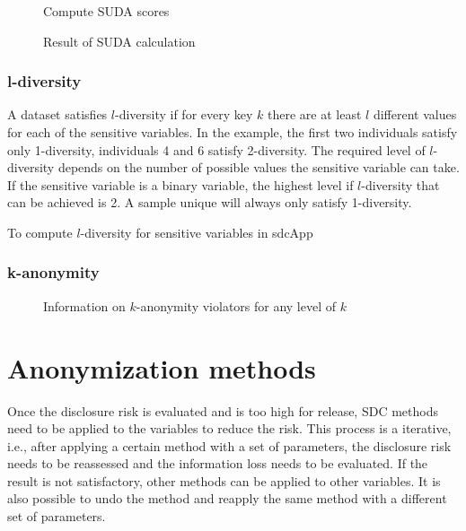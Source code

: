 \documentclass[letterpaper,10pt,english]{sphinxmanual}
\begin{document}
\begin{figure}[htbp]
\centering
\capstart

\noindent{}
\caption{Compute SUDA scores}\label{\detokenize{risk:id1}}\label{\detokenize{risk:id3}}\end{figure}

\begin{figure}[htbp]
\centering
\capstart

\noindent{}
\caption{Result of SUDA calculation}\label{\detokenize{risk:fig72}}\label{\detokenize{risk:id4}}\end{figure}


\subsection{l-diversity}
\label{\detokenize{risk:l-diversity}}
A dataset
satisfies \(l\)-diversity if for every key \(k\) there are at least
\(l\) different values for each of the sensitive variables. In the
example, the first two individuals satisfy only 1-diversity, individuals
4 and 6 satisfy 2-diversity. The required level of \(l\)-diversity
depends on the number of possible values the sensitive variable can
take. If the sensitive variable is a binary variable, the highest level
if \(l\)-diversity that can be achieved is 2. A sample unique will
always only satisfy 1-diversity.

To compute \(l\)-diversity for sensitive variables in sdcApp


\subsection{k-anonymity}
\label{\detokenize{risk:k-anonymity}}
\begin{figure}[htbp]
\centering
\capstart

\noindent{}
\caption{Information on \(k\)-anonymity violators for any level of \(k\)}\label{\detokenize{risk:fig73}}\label{\detokenize{risk:id5}}\end{figure}


\chapter{Anonymization methods}
\label{\detokenize{anon::doc}}\label{\detokenize{anon:anonymization-methods}}
Once the disclosure risk is evaluated and is too high for release, SDC methods need
to be applied to the variables to reduce the risk. This process is a iterative, i.e.,
after applying a certain method with a set of parameters, the disclosure risk
needs to be reassessed and the information loss needs to be evaluated. If the result is not
satisfactory, other methods can be applied to other variables. It is also possible to
undo the method and reapply the same method with a different  set of parameters.
\end{document}
